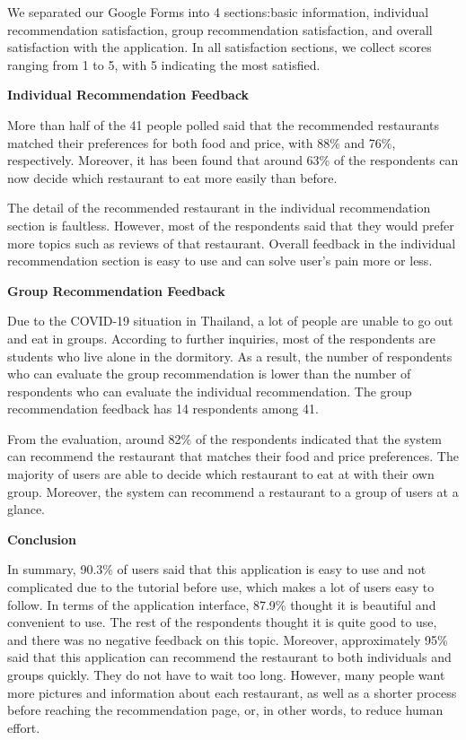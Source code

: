 \documentclass[12pt,oneside,openright,a4paper]{cpe-english-project}
\begin{document}
We separated our Google Forms into 4 sections:basic information, individual recommendation satisfaction, group recommendation satisfaction, and overall satisfaction with the application.  In all satisfaction sections, we collect scores ranging from 1 to 5, with 5 indicating the most satisfied.

\textbf{Individual Recommendation Feedback}\par

More than half of the 41 people polled said that the recommended restaurants matched their preferences for both food and price, with 88\% and 76\%, respectively. Moreover, it has been found that around 63\% of the respondents can now decide which restaurant to eat more easily than before.

The detail of the recommended restaurant in the individual recommendation section is faultless. However, most of the respondents said that they would prefer more topics such as reviews of that restaurant. Overall feedback in the individual recommendation section is easy to use and can solve user’s pain more or less.

\textbf{Group Recommendation Feedback}\par

Due to the COVID-19 situation in Thailand, a lot of people are unable to go out and eat in groups. According to  further inquiries, most of the respondents are students who live alone in the dormitory. As a result, the number of respondents who can evaluate the group recommendation is lower than the number of respondents who can evaluate the individual recommendation. The group recommendation feedback has 14 respondents among 41.

From the evaluation, around 82\% of the respondents indicated that the system can recommend the restaurant that matches their food and price preferences. The majority of users are able to decide which restaurant to eat at with their own group. Moreover, the system can recommend a restaurant to a group of users at a glance.


\textbf{Conclusion}\par

In summary, 90.3\% of users said that this application is easy to use and not complicated due to the tutorial before use, which makes a lot of users easy to follow. In terms of the application interface, 87.9\% thought it is beautiful and convenient to use. The rest of the respondents thought it is quite good to use, and there was no negative feedback on this topic. Moreover, approximately 95\% said that this application can recommend the restaurant to both individuals and groups quickly. They do not have to wait too long. However, many people want more pictures and information about each restaurant, as well as a shorter process before reaching the recommendation page, or, in other words, to reduce human effort.
\end{document}
